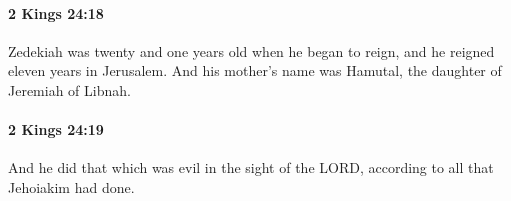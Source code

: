 		\paragraph{2 Kings 24:18} %
			\label{2KINGS-24-18}

			Zedekiah was twenty and one years old when he began to reign, and he reigned eleven years in Jerusalem. And his mother’s name was Hamutal, the daughter of Jeremiah of Libnah.


		\paragraph{2 Kings 24:19} %
			\label{2KINGS-24-19}

			And he did that which was evil in the sight of the LORD, according to all that Jehoiakim had done.


